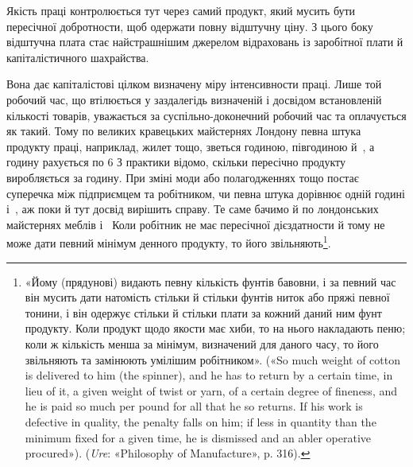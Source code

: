 Якість праці контролюється тут через самий продукт, який
мусить бути пересічної добротности, щоб одержати повну відштучну
ціну. З цього боку відштучна плата стає найстрашнішим
джерелом відраховань із заробітної плати й капіталістичного
шахрайства.

Вона дає капіталістові цілком визначену міру інтенсивности
праці. Лише той робочий час, що втілюється у заздалегідь визначеній
і досвідом встановленій кількості товарів, уважається за
суспільно-доконечний робочий час та оплачується як такий.
Тому по великих кравецьких майстернях Лондону певна штука
продукту праці, наприклад, жилет тощо, зветься годиною,
півгодиною й~, а годину рахується по 6 З практики
відомо, скільки пересічно продукту виробляється за годину.
При зміні моди або полагодженнях тощо постає суперечка між
підприємцем та робітником, чи певна штука дорівнює одній годині
і~, аж поки й тут досвід вирішить справу. Те саме бачимо й
по лондонських майстернях меблів і~ Коли робітник не має
пересічної дієздатности й тому не може дати певний мінімум денного
продукту, то його звільняють\footnote{
«Йому (прядунові) видають певну кількість фунтів бавовни, і за
певний час він мусить дати натомість стільки й стільки фунтів ниток
або пряжі певної тонини, і він одержує стільки й стільки плати за кожний
даний ним фунт продукту. Коли продукт щодо якости має хиби, то
на нього накладають пеню; коли ж кількість менша за мінімум, визначений
для даного часу, то його звільняють та замінюють умілішим робітником».
(«So much weight of cotton is delivered to him (the spinner),
and he has to return by a certain time, in lieu of it, a given weight of
twist or yarn, of a certain degree of fineness, and he is paid so much per
pound for all that he so returns. If his work is defective in quality, the
penalty falls on him; if less in quantity than the minimum fixed for a
given time, he is dismissed and an abler operative procured»). (\emph{Ure}: «Philosophy
of Manufacture», p. 316).
}.

